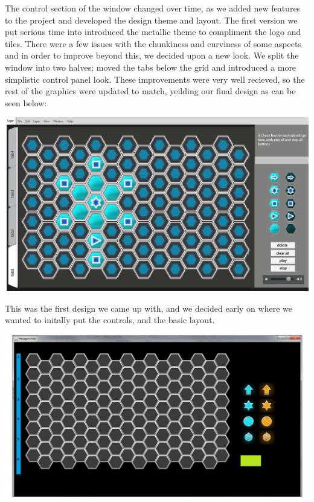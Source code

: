 \documentclass[10pt,a4paper]{article}
\begin{document}
The control section of the window changed over time, as we added new features to the project and developed the design theme and layout. The first version we put serious time into introduced the metallic theme to compliment the logo and tiles. There were a few issues with the chunkiness and curviness of some aspects and in order to improve beyond this, we decided upon a new look. We split the window into two halves; moved the tabs below the grid and introduced a more simplistic control panel look. These improvements were very well recieved, so the rest of the graphics were updated to match, yeilding our final design as can be seen below:\\
\begin{center}
\includegraphics[scale=0.45]{logoprogression1.png}
\end{center}

This was the first design we came up with, and we decided early on where we wanted to initally put the controls, and the basic layout.
\\
\begin{center}
\includegraphics[scale=0.45]{logoprogression2.png}
\end{center}
\end{document}
